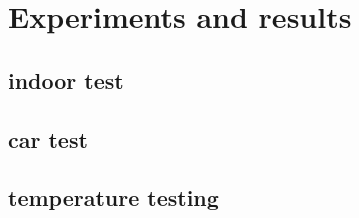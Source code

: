 \chapter{Experiments and results}
\section{indoor test}
\section{car test}
\section{temperature testing}
